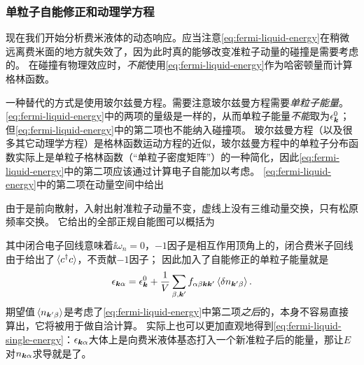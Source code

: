 \subsubsection{单粒子自能修正和动理学方程}

现在我们开始分析费米液体的动态响应。应当注意\eqref{eq:fermi-liquid-energy}在稍微远离费米面的地方就失效了，因为此时真的能够改变准粒子动量的碰撞是需要考虑的。
在碰撞有物理效应时，\emph{不能}使用\eqref{eq:fermi-liquid-energy}作为哈密顿量而计算格林函数。

一种替代的方式是使用玻尔兹曼方程。需要注意玻尔兹曼方程需要\emph{单粒子能量}。\eqref{eq:fermi-liquid-energy}中的两项的量级是一样的，从而单粒子能量\emph{不能}取为$\epsilon_{\vb*{k}}^0$；但\eqref{eq:fermi-liquid-energy}中的第二项也不能纳入碰撞项。
玻尔兹曼方程（以及很多其它动理学方程）是格林函数运动方程的近似，玻尔兹曼方程中的单粒子分布函数实际上是单粒子格林函数（“单粒子密度矩阵”）的一种简化，因此\eqref{eq:fermi-liquid-energy}中的第二项应该通过计算电子自能加以考虑。
\eqref{eq:fermi-liquid-energy}中的第二项在动量空间中给出

由于是前向散射，入射出射准粒子动量不变，虚线上没有三维动量交换，只有松原频率交换。
它给出的全部正规自能图可以概括为

其中闭合电子回线意味着$\ii \omega_n = 0$，$-1$因子是相互作用顶角上的，闭合费米子回线由于给出了$\expval*{c^\dagger c}$，不贡献$-1$因子；
因此加入了自能修正的单粒子能量就是
\begin{equation}
    \epsilon_{\vb*{k} \alpha} = \epsilon_{\vb*{k}}^0 + \frac{1}{V} \sum_{\beta, \vb*{k}'} f_{\alpha \beta \vb*{k} \vb*{k}'} \expval*{\var{n_{\vb*{k}' \beta}}}.
    \label{eq:fermi-liquid-single-energy}
\end{equation}
期望值$\expval*{n_{\vb*{k}' \beta}}$是考虑了\eqref{eq:fermi-liquid-energy}中第二项\emph{之后}的，本身不容易直接算出，它将被用于做自洽计算。
实际上也可以更加直观地得到\eqref{eq:fermi-liquid-single-energy}：$\epsilon_{\vb*{k} \alpha}$大体上是向费米液体基态打入一个新准粒子后的能量，那让$E$对$n_{\vb*{k} \alpha}$求导就是了。

